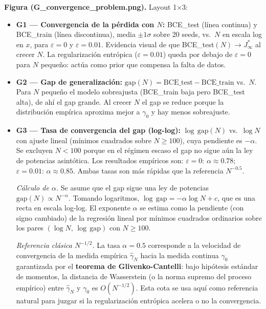 \documentclass[11pt, a4paper]{article}
\theoremstyle{definition}
\begin{document}
\textbf{Figura (G\_convergence\_problem.png).} Layout 1×3:
\begin{itemize}
  \item \textbf{G1 — Convergencia de la pérdida con $N$:} BCE\_test
        (línea continua) y BCE\_train (línea discontinua), media
        $\pm 1\sigma$ sobre 20 seeds, vs.\ $N$ en escala log en $x$, para
        $\varepsilon=0$ y $\varepsilon=0.01$. Evidencia visual de que
        BCE\_test$(N) \to J^*_\infty$ al crecer $N$. La regularización
        entrópica ($\varepsilon=0.01$) queda por debajo de $\varepsilon=0$
        para $N$ pequeño: actúa como prior que compensa la falta de datos.
  \item \textbf{G2 — Gap de generalización:}
        $\text{gap}(N) = \text{BCE\_test} - \text{BCE\_train}$ vs.\ $N$.
        Para $N$ pequeño el modelo sobreajusta (BCE\_train baja pero
        BCE\_test alta), de ahí el gap grande. Al crecer $N$ el gap se
        reduce porque la distribución empírica aproxima mejor a $\gamma_0$
        y hay menos sobreajuste.
  \item \textbf{G3 — Tasa de convergencia del gap (log-log):}
        $\log\,\text{gap}(N)$ vs.\ $\log N$ con ajuste lineal
        (mínimos cuadrados sobre $N \geq 100$), cuya pendiente es $-\alpha$.
        Se excluyen $N < 100$ porque en el régimen escaso el gap no sigue
        aún la ley de potencias asintótica. Los resultados empíricos son:
        $\varepsilon=0$: $\alpha \approx 0.78$;
        $\varepsilon=0.01$: $\alpha \approx 0.85$.
        Ambas tasas son más rápidas que la referencia $N^{-0.5}$.

        \textit{Cálculo de $\alpha$.} Se asume que el gap sigue una ley de
        potencias $\text{gap}(N) \propto N^{-\alpha}$. Tomando logaritmos,
        $\log\,\text{gap} = -\alpha\log N + c$, que es una recta en escala
        log-log. El exponente $\alpha$ se estima como la pendiente (con signo
        cambiado) de la regresión lineal por mínimos cuadrados ordinarios sobre
        los pares $(\log N,\,\log\,\text{gap})$ con $N \geq 100$.

        \textit{Referencia clásica $N^{-1/2}$.} La tasa $\alpha = 0.5$
        corresponde a la velocidad de convergencia de la medida empírica
        $\hat{\gamma}_N$ hacia la medida continua $\gamma_0$ garantizada por el
        \textbf{teorema de Glivenko-Cantelli}: bajo hipótesis
        estándar de momentos, la distancia de Wasserstein (o la norma supremo
        del proceso empírico) entre $\hat{\gamma}_N$ y $\gamma_0$ es
        $O(N^{-1/2})$. Esta cota se usa aquí como referencia natural para
        juzgar si la regularización entrópica acelera o no la convergencia.
\end{itemize}
\end{document}

